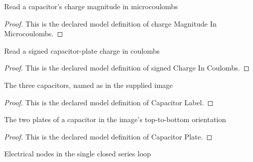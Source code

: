 \begin{definition}
  \label{def:physics:phyx-mini-0879:phyxminiproblems-problemphyxmini0879-chargemagnitudeinmicrocoulombs}
  Read a capacitor's charge magnitude in microcoulombs
\end{definition}
\begin{proof}
  This is the declared model definition of charge Magnitude In Microcoulombs.
\end{proof}
\begin{definition}
  \label{def:physics:phyx-mini-0879:phyxminiproblems-problemphyxmini0879-signedchargeincoulombs}
  Read a signed capacitor-plate charge in coulombs
\end{definition}
\begin{proof}
  This is the declared model definition of signed Charge In Coulombs.
\end{proof}
\begin{definition}
  \label{def:physics:phyx-mini-0879:phyxminiproblems-problemphyxmini0879-capacitorlabel}
  The three capacitors, named as in the supplied image
\end{definition}
\begin{proof}
  This is the declared model definition of Capacitor Label.
\end{proof}
\begin{definition}
  \label{def:physics:phyx-mini-0879:phyxminiproblems-problemphyxmini0879-capacitorplate}
  The two plates of a capacitor in the image's top-to-bottom orientation
\end{definition}
\begin{proof}
  This is the declared model definition of Capacitor Plate.
\end{proof}
\begin{definition}
  \label{def:physics:phyx-mini-0879:phyxminiproblems-problemphyxmini0879-circuitnode}
  Electrical nodes in the single closed series loop
\end{definition}
